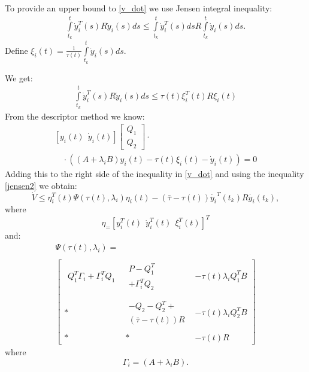 \documentclass[conference]{IEEEtran}
\begin{document}
To provide an upper bound to \eqref{v_dot} we use Jensen integral inequality:
\begin{equation}\label{jensen}
\begin{array}{c}
\displaystyle \int\limits_{t_k}^{t}\dot{y}_i^T(s)R\dot{y}_i(s)ds \leq \int\limits_{t_k}^{t}\dot{y}_i^T(s)ds R\int\limits_{t_k}^{t}\dot{y}_i(s)ds.
\end{array}
\end{equation}
Define $\xi_i(t)=\displaystyle \frac{1}{\tau(t)}\int\limits_{t_k}^{t}\dot{y}_i(s)ds$.

We get:
\begin{equation}\label{jensen2}
\begin{array}{c}
\displaystyle \int\limits_{t_k}^{t}\dot{y}_i^T(s)R\dot{y}_i(s)ds \leq  \tau(t) \xi^T_i(t)R\xi_i(t)
\end{array}
\end{equation}
From the descriptor method  \cite{fridman2001descriptor} we know:
\begin{equation}
\begin{array}{r}
[y_i(t)\ \ \dot{y}_i(t)]\left[\begin{array}{c}
 Q_{1}\\
Q_{2}
\end{array} \right] \cdot \\ \quad \cdot(( A+\lambda_i B)y_i(t)-\tau(t)\xi_i(t)-\dot y_i(t)) =0 \end{array}
\end{equation}
Adding this to the right side of the inequality in \eqref{v_dot} and using the inequality \eqref{jensen2} we obtain:
\begin{equation*}
\dot{V}\leq \eta_i^T(t)\Psi(\tau(t),\lambda_i) \eta_i(t)-(\bar{\tau}-\tau(t))\dot{y_i}^T(t_k)R\dot{y_i}(t_k),
\end{equation*}
where $$\eta_=[y^T_i(t)\ \ \dot{y}^T_i(t) \ \ \xi^T_i(t)]^T$$ and:
\begin{equation}
\begin{array}{c}
\Psi(\tau(t),\lambda_i)= \\~\\ \left[\begin{array}{ccc}
\begin{array}{c} Q^T_{1}\Gamma_i+  \Gamma_i^T Q_{1} \end{array} & \begin{array}{c} P-Q^T_{1} \\
+\Gamma_i^T Q_{2} \end{array} &-\tau(t)\lambda_i Q^T_{1} {B}  \\~\\
* & \begin{array}{c} -Q_{2}-Q^T_{2}+\\ (\bar\tau-\tau(t))R \end{array} &-\tau(t)\lambda_i Q^T_{2}{B}  \\~\\
* & * & -\tau(t)R
\end{array} \right] \end{array}
\end{equation}
where $$\Gamma_i=({A}+\lambda_i {B}).$$
\end{document}
